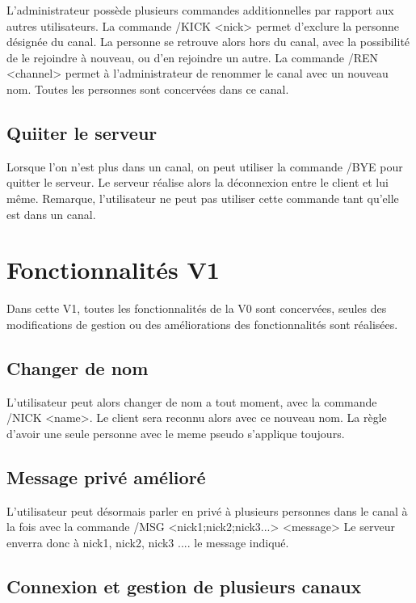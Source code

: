 \documentclass[10pt]{article}
\begin{document}
L'administrateur possède plusieurs commandes additionnelles par rapport aux autres utilisateurs.
La commande /KICK <nick> permet d'exclure la personne désignée du canal. La personne se retrouve alors hors du canal, avec la possibilité de le rejoindre à nouveau, ou d'en rejoindre un autre.
La commande /REN <channel> permet à l'administrateur de renommer le canal avec un nouveau nom. Toutes les personnes sont concervées dans ce canal.

\subsection{Quiiter le serveur}

Lorsque l'on n'est plus dans un canal, on peut utiliser la commande /BYE pour quitter le serveur. Le serveur réalise alors la déconnexion entre le client et lui même.
Remarque, l'utilisateur ne peut pas utiliser cette commande tant qu'elle est dans un canal.

\section{Fonctionnalités V1}

Dans cette V1, toutes les fonctionnalités de la V0 sont concervées, seules des modifications de gestion ou des améliorations des fonctionnalités sont réalisées.

\subsection{Changer de nom}

L'utilisateur peut alors changer de nom a tout moment, avec la commande /NICK <name>. Le client sera reconnu alors avec ce nouveau nom.
La règle d'avoir une seule personne avec le meme pseudo s'applique toujours.

\subsection{Message privé amélioré}

L'utilisateur peut désormais parler en privé à plusieurs personnes dans le canal à la fois avec la commande /MSG <nick1;nick2;nick3...> <message>
Le serveur enverra donc à nick1, nick2, nick3 .... le message indiqué.

\subsection{Connexion et gestion de plusieurs canaux}
\end{document}
